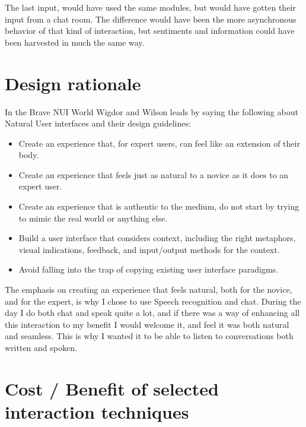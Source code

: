 \documentclass[11pt,fleqn]{book} %
\begin{document}
The last input, would have used the same modules, but would have gotten their input from a chat room. The difference would have been the more asynchronous behavior of that kind of interaction, but sentiments and information could have been harvested in much the same way.
\section{Design rationale}
In the Brave NUI World\cite{Wigdor2010BraveWorld} Wigdor and Wilson leads by saying the following about Natural User interfaces and their design guidelines:
\begin{itemize}
\item Create an experience that, for expert users, can feel like an extension of their body.
\item Create an experience that feels just as natural to a novice as it does to an
expert user.
\item Create an experience that is authentic to the medium, do not start by trying to
mimic the real world or anything else.
\item Build a user interface that considers context, including the right metaphors,
visual indications, feedback, and input/output methods for the context.
\item Avoid falling into the trap of copying existing user interface paradigms.
\end{itemize}

The emphasis on creating an experience that feels natural, both for the novice, and for the expert, is why I chose to use Speech recognition and chat. During the day I do both chat and speak quite a lot, and if there was a way of enhancing all this interaction to my benefit I would welcome it, and feel it was both natural and seamless.
This is why I wanted it to be able to listen to conversations both written and spoken.

\section{Cost / Benefit of selected interaction techniques}
\end{document}
